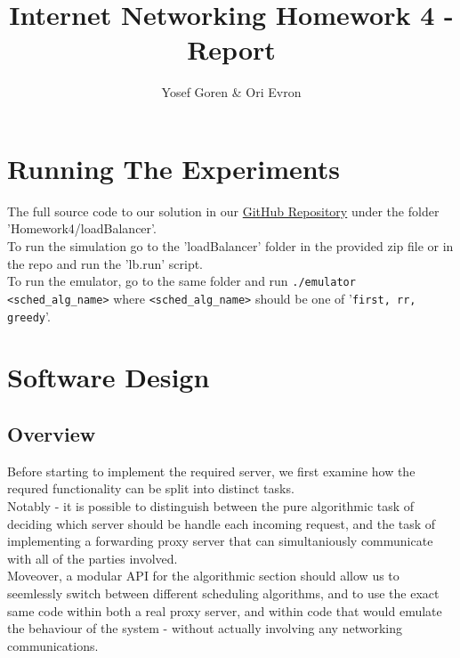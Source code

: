 \documentclass{article}
\begin{document}
\author{Yosef Goren \& Ori Evron}
\title{Internet Networking Homework 4 - Report}
\maketitle
\tableofcontents

\section{Running The Experiments}
The full source code to our solution in our \href{https://github.com/yosefgoren/Internet-Networking-236341}{GitHub Repository}
under the folder 'Homework4/loadBalancer'.\\
To run the simulation go to the 'loadBalancer' folder in the provided zip file or in the repo
and run the 'lb.run' script.\\
To run the emulator, go to the same folder and run \texttt{./emulator <sched\_alg\_name>}
where \texttt{<sched\_alg\_name>} should be one of '\texttt{first, rr, greedy}'.

\section{Software Design}
\subsection{Overview}
Before starting to implement the required server, we first examine
how the requred functionality can be split into distinct tasks.\\
Notably - it is possible to distinguish between the pure algorithmic task
of deciding which server should be handle each incoming request,
and the task of implementing a forwarding proxy server that can simultaniously communicate
with all of the parties involved.\\
Moveover, a modular API for the algorithmic section should allow us to
seemlessly switch between different scheduling algorithms, and to use the exact same code
within both a real proxy server, and within code that would emulate the behaviour of the system -
without actually involving any networking communications.\\
\end{document}
